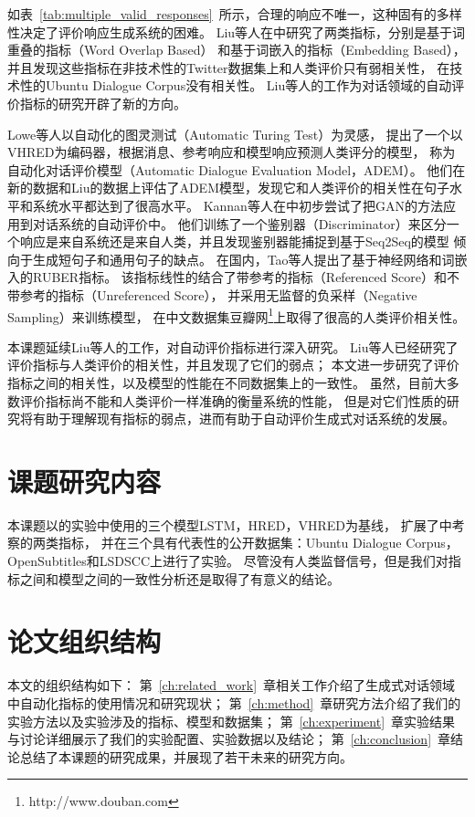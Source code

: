 如表~\ref{tab:multiple_valid_responses}~所示，合理的响应不唯一，这种固有的多样性决定了评价响应生成系统的困难。
Liu等人在\cite{HowNot}中研究了两类指标，分别是基于词重叠的指标（Word Overlap Based）
和基于词嵌入的指标（Embedding Based），并且发现这些指标在非技术性的Twitter数据集上和人类评价只有弱相关性，
在技术性的Ubuntu Dialogue Corpus没有相关性。
Liu等人的工作为对话领域的自动评价指标的研究开辟了新的方向。

Lowe等人以自动化的图灵测试（Automatic Turing Test）为灵感，
提出了一个以VHRED为编码器，根据消息、参考响应和模型响应预测人类评分的模型，
称为自动化对话评价模型（Automatic Dialogue Evaluation Model，ADEM）。
他们在新的数据和Liu的数据上评估了ADEM模型，发现它和人类评价的相关性在句子水平和系统水平都达到了很高水平。
Kannan等人在\cite{AdverEval}中初步尝试了把GAN的方法应用到对话系统的自动评价中。
他们训练了一个鉴别器（Discriminator）来区分一个响应是来自系统还是来自人类，并且发现鉴别器能捕捉到基于Seq2Seq的模型
倾向于生成短句子和通用句子的缺点。
在国内，Tao等人提出了基于神经网络和词嵌入的RUBER指标。
该指标线性的结合了带参考的指标（Referenced Score）和不带参考的指标（Unreferenced Score），
并采用无监督的负采样（Negative Sampling）来训练模型，
在中文数据集豆瓣网\footnote{http://www.douban.com}上取得了很高的人类评价相关性。 %

本课题延续Liu等人的工作，对自动评价指标进行深入研究。
Liu等人已经研究了评价指标与人类评价的相关性，并且发现了它们的弱点；
本文进一步研究了评价指标之间的相关性，以及模型的性能在不同数据集上的一致性。
虽然，目前大多数评价指标尚不能和人类评价一样准确的衡量系统的性能，
但是对它们性质的研究将有助于理解现有指标的弱点，进而有助于自动评价生成式对话系统的发展。

\section{课题研究内容}\label{sec:reseach_content}
本课题以\cite{VHRED}的实验中使用的三个模型LSTM，HRED，VHRED为基线，
扩展了\cite{HowNot}中考察的两类指标，
并在三个具有代表性的公开数据集：Ubuntu Dialogue Corpus，OpenSubtitles和LSDSCC上进行了实验。
尽管没有人类监督信号，但是我们对指标之间和模型之间的一致性分析还是取得了有意义的结论。

\section{论文组织结构}\label{sec:paper_organization}
本文的组织结构如下：
第~\ref{ch:related_work}~章相关工作介绍了生成式对话领域中自动化指标的使用情况和研究现状；
第~\ref{ch:method}~章研究方法介绍了我们的实验方法以及实验涉及的指标、模型和数据集；
第~\ref{ch:experiment}~章实验结果与讨论详细展示了我们的实验配置、实验数据以及结论；
第~\ref{ch:conclusion}~章结论总结了本课题的研究成果，并展现了若干未来的研究方向。
